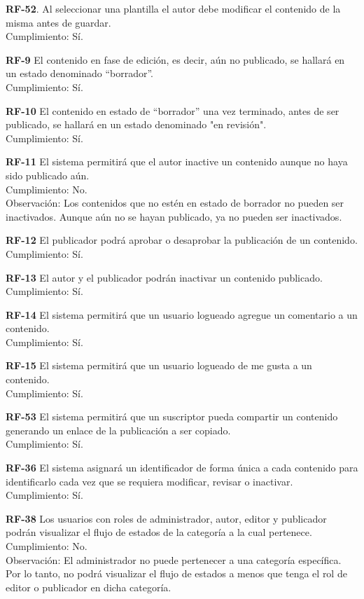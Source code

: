\documentclass[10pt,times,twocolumn]{article}
\begin{document}
\noindent \textbf{RF-52}. Al seleccionar una plantilla el autor debe modificar el contenido de la misma antes de guardar.\\
Cumplimiento: Sí.

\noindent \textbf{RF-9} El contenido en fase de edición, es decir, aún no publicado, se hallará en un  estado denominado “borrador”.\\
Cumplimiento: Sí.

\noindent \textbf{RF-10} El contenido en estado de “borrador” una vez terminado, antes de ser publicado, se hallará en un estado denominado "en revisión".\\
Cumplimiento: Sí.

\noindent \textbf{RF-11} El sistema permitirá que el autor inactive un contenido aunque no haya sido publicado aún.\\
Cumplimiento: No.\\
Observación: Los contenidos que no estén en estado de borrador no pueden ser inactivados. Aunque aún no se hayan publicado, ya no pueden ser inactivados.

\noindent \textbf{RF-12} El publicador podrá aprobar o desaprobar la publicación de un contenido.\\
Cumplimiento: Sí.

\noindent \textbf{RF-13} El autor y el publicador podrán inactivar un contenido publicado.\\
Cumplimiento: Sí.

\noindent \textbf{RF-14} El sistema permitirá que un usuario logueado agregue un comentario a un  contenido.\\
Cumplimiento: Sí.

\noindent \textbf{RF-15} El sistema permitirá que un usuario logueado de me gusta a un contenido.\\
Cumplimiento: Sí.

\noindent \textbf{RF-53} El sistema permitirá que un suscriptor pueda compartir un contenido generando un enlace de la publicación a ser copiado.\\
Cumplimiento: Sí.

\noindent \textbf{RF-36} El sistema asignará un identificador de forma única a cada contenido para  identificarlo cada vez que se requiera modificar, revisar o inactivar.\\
Cumplimiento: Sí.

\noindent \textbf{RF-38} Los usuarios con roles de administrador, autor, editor y publicador podrán visualizar el flujo de estados de la categoría a la cual pertenece.\\
Cumplimiento: No.\\
Observación: El administrador no puede pertenecer a una categoría específica. Por lo tanto, no podrá visualizar el flujo de estados a menos que tenga el rol de editor o publicador en dicha categoría.
\end{document}
